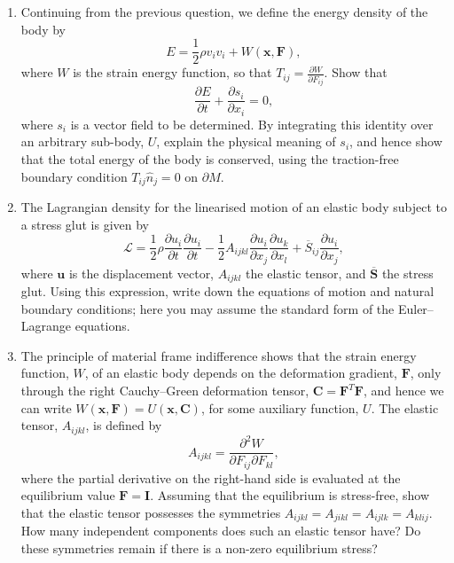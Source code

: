 \begin{enumerate}
\item Continuing from the previous question, we define the energy density of the body by
\begin{equation*}
    E=\frac{1}{2}\rho v_{i}v_{i}+W(\mathbf{x},\mathbf{F}),
\end{equation*}
where $W$ is the strain energy function, so that $T_{ij}=\frac{\partial W}{\partial F_{ij}}$. Show that
\begin{equation*}
    \frac{\partial E}{\partial t}+\frac{\partial s_{i}}{\partial x_{i}}=0,
\end{equation*}
where $s_{i}$ is a vector field to be determined. By integrating this identity over an arbitrary sub-body, $U$, explain the physical meaning of $s_{i}$, and hence show that the total energy of the body is conserved, using the traction-free boundary condition $T_{ij}\hat{n}_{j}=0$ on $\partial M$.

\item The Lagrangian density for the linearised motion of an elastic body subject to a stress glut is given by
\begin{equation*}
    \mathcal{L}=\frac{1}{2}\rho\frac{\partial u_{i}}{\partial t}\frac{\partial u_{i}}{\partial t}-\frac{1}{2}A_{ijkl}\frac{\partial u_{i}}{\partial x_{j}}\frac{\partial u_{k}}{\partial x_{l}}+\overline{S}_{ij}\frac{\partial u_{i}}{\partial x_{j}},
\end{equation*}
where $\mathbf{u}$ is the displacement vector, $A_{ijkl}$ the elastic tensor, and $\overline{\mathbf{S}}$ the stress glut. Using this expression, write down the equations of motion and natural boundary conditions; here you may assume the standard form of the Euler--Lagrange equations.

\item The principle of material frame indifference shows that the strain energy function, $W$, of an elastic body depends on the deformation gradient, $\mathbf{F}$, only through the right Cauchy--Green deformation tensor, $\mathbf{C}=\mathbf{F}^{T}\mathbf{F}$, and hence we can write $W(\mathbf{x},\mathbf{F})=U(\mathbf{x},\mathbf{C})$, for some auxiliary function, $U$. The elastic tensor, $A_{ijkl}$, is defined by
\begin{equation*}
    A_{ijkl}=\frac{\partial^{2}W}{\partial F_{ij}\partial F_{kl}},
\end{equation*}
where the partial derivative on the right-hand side is evaluated at the equilibrium value $\mathbf{F}=\mathbf{I}$. Assuming that the equilibrium is stress-free, show that the elastic tensor possesses the symmetries $A_{ijkl}=A_{jikl}=A_{ijlk}=A_{klij}$.
How many independent components does such an elastic tensor have? Do these symmetries remain if there is a non-zero equilibrium stress?


\end{enumerate}
